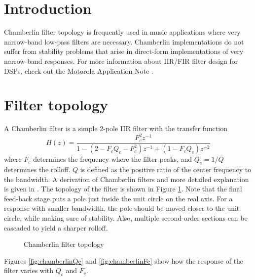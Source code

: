 \documentclass[11pt]{handout}
\begin{document}
\setlength{\baselineskip}{0.5cm}
\setlength{\parskip}{0.5cm}

\makeboxtitle
\vspace{0.3cm}

\section{Introduction}
Chamberlin filter topology is frequently used in music applications 
where very narrow-band low-pass filters are necessary.  Chamberlin 
implementations do not suffer from stability problems that arise 
in direct-form implementations of very narrow-band responses.  For more 
information about IIR/FIR filter design for DSPs, check out the 
Motorola Application Note \cite{Motorola}.

\section{Filter topology}
A Chamberlin filter is a simple 2-pole IIR filter with the transfer 
function
\begin{equation}
        H(z) = \frac{F_{c}^2 z^{-1}} 
        {1 - (2 - F_{c}Q_{c} - F_{c}^2) z^{-1} + (1-F_{c}Q_{c})z^{-2}}
\end{equation}
where $F_{c}$ determines the frequency where the filter peaks, and 
$Q_c = 1/Q$ determines the rolloff.  $Q$ is defined as the 
positive ratio of the center frequency to the bandwidth.  
A derivation of Chamberlin filters 
and more detailed explanation is given in \cite{Dattorro}.  
The topology of the filter is shown in Figure \ref{fig:chamberlin}.  
Note that the final feed-back stage puts a pole just inside the unit 
circle on the real axis.  For a response with smaller bandwidth, the 
pole should be moved closer to the unit circle, while making sure of 
stability.  Also, multiple second-order sections can be cascaded to 
yield a sharper rolloff.

\begin{figure}[htb]
   \begin{center}
      \vspace*{0.5cm}
      \caption{Chamberlin filter topology}
      \label{fig:chamberlin}
   \end{center}
\end{figure}

Figures \ref{fig:chamberlinQc} and \ref{fig:chamberlinFc} show how 
the response of the filter varies with $Q_c$ and $F_c$.
\end{document}
